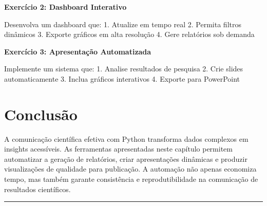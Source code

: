 \begin{exercisebox}
\textbf{Exercício 2: Dashboard Interativo}

Desenvolva um dashboard que:
1. Atualize em tempo real
2. Permita filtros dinâmicos
3. Exporte gráficos em alta resolução
4. Gere relatórios sob demanda
\end{exercisebox}

\begin{exercisebox}
\textbf{Exercício 3: Apresentação Automatizada}

Implemente um sistema que:
1. Analise resultados de pesquisa
2. Crie slides automaticamente
3. Inclua gráficos interativos
4. Exporte para PowerPoint
\end{exercisebox}

\section{Conclusão}

A comunicação científica efetiva com Python transforma dados complexos em insights acessíveis. As ferramentas apresentadas neste capítulo permitem automatizar a geração de relatórios, criar apresentações dinâmicas e produzir visualizações de qualidade para publicação. A automação não apenas economiza tempo, mas também garante consistência e reprodutibilidade na comunicação de resultados científicos.

\vspace{1cm}
\begin{center}
\rule{0.8\textwidth}{0.4pt}
\end{center}
